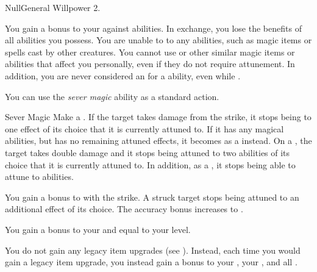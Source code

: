     \begin{feat}{Null}{General}
        \featpre Willpower 2.

         You gain a  bonus to your  against  abilities.
        In exchange, you lose the benefits of all  abilities you possess.
        You are unable to  to any  abilities, such as magic items or spells cast by other creatures.
        You cannot use  or other similar magic items or abilities that affect you personally, even if they do not require attunement.
        In addition, you are never considered an  for a  ability, even while \unconscious.

         You can use the \textit{sever magic} ability as a standard action.
        \begin{activeability}{Sever Magic}
            \rankline
            Make a .
            If the target takes damage from the strike, it stops being  to one effect of its choice that it is currently attuned to.
            If it has any magical abilities, but has no remaining attuned effects, it becomes \dazed as a  instead.
            On a , the target takes double damage and it stops being attuned to two abilities of its choice that it is currently attuned to.
            In addition, as a , it stops being able to attune to abilities.

            \rankline
             You gain a  bonus to  with the strike.
             A struck target stops being attuned to an additional effect of its choice.
             The accuracy bonus increases to .
        \end{activeability}

         You gain a bonus to your  and  equal to your level.

         You do not gain any legacy item upgrades (see ).
        Instead, each time you would gain a legacy item upgrade, you instead gain a  bonus to your , your , and all .


\end{feat}
